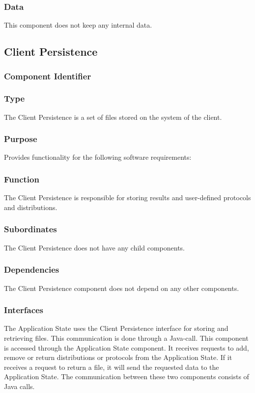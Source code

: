 \subsubsection*{Data}
This component does not keep any internal data.

\subsection{Client Persistence}

\subsubsection*{Component Identifier}
\RTMCCP{}

\subsubsection*{Type}
The Client Persistence is a set of files stored on the system of the client.

\subsubsection*{Purpose}
Provides functionality for the following software requirements:

\noindent {}

\subsubsection*{Function}
The Client Persistence is responsible for storing results and user-defined protocols and distributions.

\subsubsection*{Subordinates}
The Client Persistence does not have any child components.


\subsubsection*{Dependencies}
The Client Persistence component does not depend on any other components.

\subsubsection*{Interfaces}
The Application State uses the Client Persistence interface for storing and retrieving files. This communication is done through a Java-call.
This component is accessed through the Application State component. It receives requests to add, remove or return distributions or protocols from the Application State. If it receives a request to return a file, it will send the requested data to the Application State. The communication between these two components consists of Java calls.

